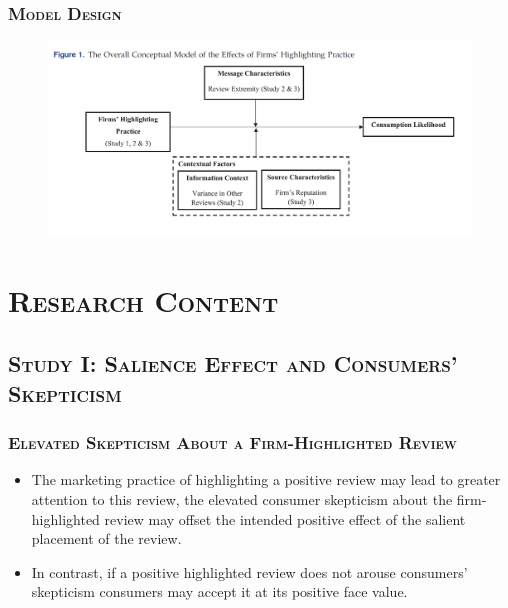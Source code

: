 \documentclass{../presentation}
\begin{document}
    \begin{frame}
        \frametitle{\textsc{Model Design}}

        \begin{figure}
            \includegraphics[width=0.9\linewidth]{pre04-imgs/pre04-1.png}
        \end{figure}

    \end{frame}

    \section{\textsc{Research Content}}

    \subsection[\textsc{Study I}]{\textsc{Study I: Salience Effect and Consumers' Skepticism}}

    \begin{frame}
        \frametitle{\textsc{Elevated Skepticism About a Firm-Highlighted Review}}

        \begin{itemize}
            \item The marketing practice of highlighting a positive review may lead to greater attention to this review,
            the elevated consumer skepticism about the firm-highlighted review may offset the intended positive effect of the salient placement of the review.
            \item In contrast, if a positive highlighted review does not arouse consumers' skepticism consumers may accept it at its positive face value.
        \end{itemize}

    \end{frame}
\end{document}
